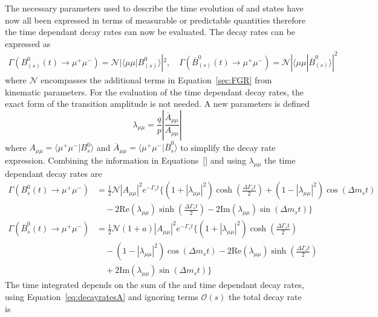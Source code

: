 The necessary parameters used to describe the time evolution of \bsd and \barbsd states have now all been expressed in terms of measurable or predictable quantities therefore the time dependant decay rates can now be evaluated. The decay rates can be expressed as
\begin{align}
\Gamma (B^0_{(s)}(t) \to \mu^+ \mu^-) = \mathcal{N}|\langle \mu \mu | B^0_{(s)} \rangle|^2, \quad
\Gamma (\overline{B}^0_{(s)}(t) \to \mu^+ \mu^-) =\mathcal{N}|\langle \mu\mu | \overline{B}^0_{(s)} \rangle|^2
\end{align}
where $\mathcal{N}$ encompasses the additional terms in Equation~\ref{sec:FGR} from kinematic parameters. For the evaluation of the time dependant decay rates, the exact form of the transition amplitude is not needed. A new parameters is defined
\begin{equation}
\lambda_{\mu\mu} = \frac{q}{p} \left| \frac{\overline{A}_{\mu\mu}}{A_{\mu\mu}}\right|
\end{equation}
where $A_{\mu\mu} = \langle \mu^+\mu^- | B^0_s \rangle$ and $\overline{A}_{\mu\mu} = \langle \mu^+\mu^- |\overline{B}^0_s \rangle$ to simplify the decay rate expression. Combining the information in Equations~\ref{} and using $\lambda_{\mu\mu}$ the time dependant decay rates are
\begin{align}
\Gamma(B^0_s(t) \to \mu^+ \mu^-) &=  \frac{1}{2} \mathcal{N} |A_{\mu\mu}|^2 e^{- \Gamma_s t} \bigg\{ (1 + |\lambda_{\mu\mu}|^2) \cosh \left( \frac{\Delta \Gamma_s t}{2} \right) + ( 1 - |\lambda_{\mu\mu}|^2) \cos(\Delta m_s t) \nonumber \\
& \quad {}- 2\mathrm{Re}(\lambda_{\mu\mu})\sinh \left(\frac{\Delta \Gamma_s t}{2}\right) - 2\mathrm{Im}(\lambda_{\mu\mu})\sin(\Delta m_s t) \bigg\} \\
\Gamma(\overline{B}^0_s(t) \to \mu^+ \mu^-) &=  \frac{1}{2} \mathcal{N} (1 + a)|A_{\mu\mu}|^2 e^{- \Gamma_s t} \bigg\{ (1 + |\lambda_{\mu\mu}|^2) \cosh \left( \frac{\Delta \Gamma_s t}{2} \right) \nonumber \\
& \quad {}- ( 1 - |\lambda_{\mu\mu}|^2) \cos(\Delta m_s t) -2\mathrm{Re}(\lambda_{\mu\mu})\sinh \left(\frac{\Delta \Gamma_s t}{2}\right) \nonumber\\ 
& \quad {}+ 2\mathrm{Im}(\lambda_{\mu\mu})\sin(\Delta m_s t) \bigg\}
\label{eq:decayratesA}
\end{align}
The time integrated \BF depends on the sum of the \bsd and \barbsd time dependant decay rates, using Equation~\ref{eq:decayratesA} and ignoring terms $\mathcal{O}(s)$ the total decay rate is
